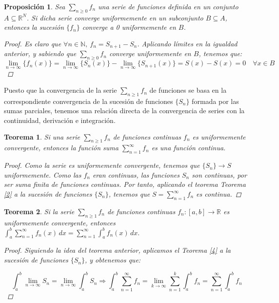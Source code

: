 \documentclass[11pt, a4paper]{article}
\newcommand{\N}{\mathbb{N}}
\newcommand{\fn}{\{f_n\}}
\theoremstyle{theorem-style}
\newtheorem{nth}{Teorema}[section]
\newtheorem{nprop}{Proposición}[section]
\theoremstyle{definition-style}
\theoremstyle{remark-style}
\theoremstyle{example-style}
\begin{document}
\begin{nprop}
	Sea $\sum_{n \ge 0} f_n$ una serie de funciones definida en un conjunto $A \subseteq \mathbb{R}^N$. Si dicha serie converge uniformemente en un subconjunto $B \subseteq A$, entonces la sucesión $\fn$ converge a 0 uniformemente en $B$.
	
\begin{proof}
Es claro que $\forall n \in \N,\ f_n = S_{n+1} - S_n$. Aplicando límites en la igualdad anterior, y sabiendo que $\sum_{n\ge 0} f_n$ converge uniformemente en $B$, tenemos que: 
$$\lim_{n \to \infty} \{f_n(x)\} = \lim_{n \to \infty} \{S_n(x)\} - \lim_{n \to \infty} \{S_{n + 1}(x)\} = S(x) - S(x) = 0\quad \forall x \in B$$
\end{proof}
\end{nprop}

Puesto que  la convergencia de la serie $\sum_{n\geq 1} f_n$ de funciones se basa en la correspondiente convergencia de la sucesi\'on de funciones $\{S_n\}$ formada por las sumas parciales, tenemos una relación directa de la convergencia de series con la continuidad, derivación e integración.


\begin{nth} \label{7}
Si una serie  $\sum_{n\geq 1} f_n $ de funciones continuas $f_n$ es uniformemente convergente, entonces la funci\'on suma $\displaystyle \sum_{n=1}^{\infty} f_n $ es una funci\'on continua.

\begin{proof}
Como la serie es uniformemente convergente, tenemos que $\{S_n\} \to S$ uniformemente. Como las $f_n$ eran continuas, las funciones $S_n$ son continuas, por ser suma finita de funciones continuas. Por tanto, aplicando el teorema \textit{Teorema \ref{2}} a la sucesión de funciones $\{S_n\}$, tenemos que $S = \sum_{n=1}^{\infty} f_n$ es continua.
\end{proof}
\end{nth}


\begin{nth} \label{8}
Si la serie $\sum_{n\geq 1} f_n $ de funciones continuas $f_n:[a,b]\longrightarrow \mathbb R$ es uniformemente convergente, entonces 
$
\displaystyle \int_a^b \sum_{n=1}^{\infty} f_n (x) \, dx =  \sum_{n=1}^{\infty} \int_a^b f_n (x) \, dx  .
$

\begin{proof}
Siguiendo la idea del teorema anterior, aplicamos el \textit{Teorema \ref{4}} a la sucesión de funciones $\{S_n\}$, y obtenemos que:

$$\int_a^b \lim_{n \to \infty} S_n = \lim_{n \to \infty} \int_a^b S_n \Rightarrow \int_a^b \sum_{n=1}^{\infty} f_n = \lim_{k \to \infty} \sum_{n=1}^k \int_a^b f_n = \sum_{n =1}^{\infty} \int_a^b f_n$$
\end{proof}
\end{nth}
\end{document}
